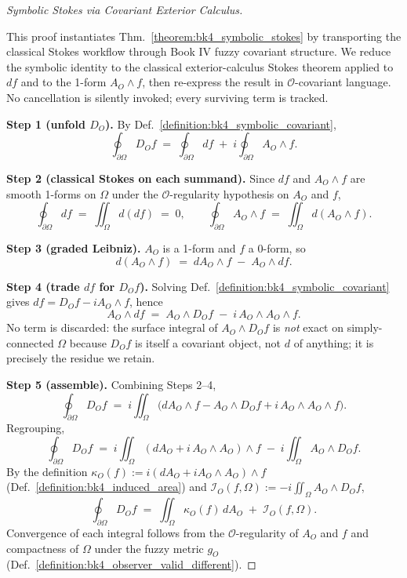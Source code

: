 \begin{proof}[Symbolic Stokes via Covariant Exterior Calculus]
\label{proof:bk4_sketch_stokes}
\leavevmode

This proof instantiates Thm.~\ref{theorem:bk4_symbolic_stokes} by transporting the classical Stokes workflow through Book IV fuzzy covariant structure. We reduce the symbolic identity to the classical exterior-calculus Stokes theorem applied to $df$ and to the 1-form $A_O \wedge f$, then re-express the result in $\mathcal{O}$-covariant language. No cancellation is silently invoked; every surviving term is tracked.

\textbf{Step 1 (unfold $D_O$).} By Def.~\ref{definition:bk4_symbolic_covariant},
\[
\oint_{\partial\Omega} D_O f \;=\; \oint_{\partial\Omega} df \;+\; i \oint_{\partial\Omega} A_O \wedge f.
\]

\textbf{Step 2 (classical Stokes on each summand).} Since $df$ and $A_O \wedge f$ are smooth 1-forms on $\Omega$ under the $\mathcal{O}$-regularity hypothesis on $A_O$ and $f$,
\[
\oint_{\partial\Omega} df \;=\; \iint_\Omega d(df) \;=\; 0, \qquad
\oint_{\partial\Omega} A_O \wedge f \;=\; \iint_\Omega d(A_O \wedge f).
\]

\textbf{Step 3 (graded Leibniz).} $A_O$ is a 1-form and $f$ a 0-form, so
\[
d(A_O \wedge f) \;=\; dA_O \wedge f \;-\; A_O \wedge df.
\]

\textbf{Step 4 (trade $df$ for $D_O f$).} Solving Def.~\ref{definition:bk4_symbolic_covariant} gives $df = D_O f - iA_O \wedge f$, hence
\[
A_O \wedge df \;=\; A_O \wedge D_O f \;-\; i\, A_O \wedge A_O \wedge f.
\]
No term is discarded: the surface integral of $A_O \wedge D_O f$ is \emph{not} exact on simply-connected $\Omega$ because $D_O f$ is itself a covariant object, not $d$ of anything; it is precisely the residue we retain.

\textbf{Step 5 (assemble).} Combining Steps 2--4,
\[
\oint_{\partial\Omega} D_O f \;=\; i \iint_\Omega \bigl( dA_O \wedge f - A_O \wedge D_O f + i\, A_O \wedge A_O \wedge f \bigr).
\]
Regrouping,
\[
\oint_{\partial\Omega} D_O f \;=\; i \iint_\Omega (dA_O + i\, A_O \wedge A_O) \wedge f \;-\; i \iint_\Omega A_O \wedge D_O f.
\]
By the definition $\kappa_O(f) := i(dA_O + iA_O \wedge A_O) \wedge f$ (Def.~\ref{definition:bk4_induced_area}) and $\mathcal{I}_O(f,\Omega) := -i \iint_\Omega A_O \wedge D_O f$,
\[
\oint_{\partial\Omega} D_O f \;=\; \iint_\Omega \kappa_O(f)\, dA_O \;+\; \mathcal{I}_O(f,\Omega).
\]
Convergence of each integral follows from the $\mathcal{O}$-regularity of $A_O$ and $f$ and compactness of $\Omega$ under the fuzzy metric $g_O$ (Def.~\ref{definition:bk4_observer_valid_different}).


\end{proof}
